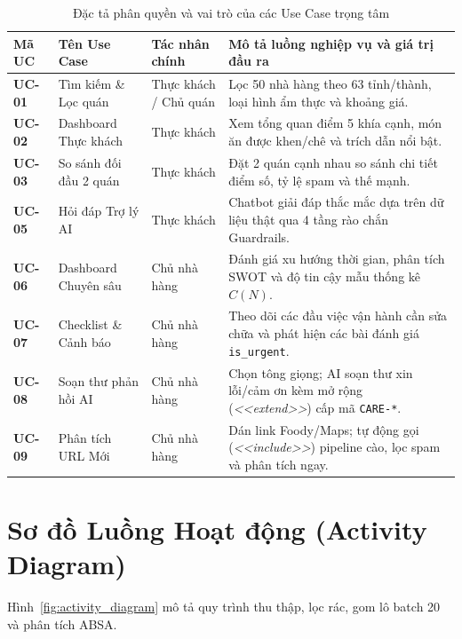 \documentclass[12pt, a4paper, oneside]{book}
\begin{document}
\begin{table}[H]
\centering
\caption{Đặc tả phân quyền và vai trò của các Use Case trọng tâm}
\label{tab:usecase_spec}
\vspace{0.15cm}
\footnotesize
\begin{tabularx}{\textwidth}{l l l X}
\toprule
\rowcolor{blue!8}
\textbf{Mã UC} & \textbf{Tên Use Case} & \textbf{Tác nhân chính} & \textbf{Mô tả luồng nghiệp vụ và giá trị đầu ra} \\
\midrule
\textbf{UC-01} & Tìm kiếm \& Lọc quán & Thực khách / Chủ quán & Lọc 50 nhà hàng theo 63 tỉnh/thành, loại hình ẩm thực và khoảng giá. \\
\textbf{UC-02} & Dashboard Thực khách & Thực khách & Xem tổng quan điểm 5 khía cạnh, món ăn được khen/chê và trích dẫn nổi bật. \\
\textbf{UC-03} & So sánh đối đầu 2 quán & Thực khách & Đặt 2 quán cạnh nhau so sánh chi tiết điểm số, tỷ lệ spam và thế mạnh. \\
\textbf{UC-05} & Hỏi đáp Trợ lý AI & Thực khách & Chatbot giải đáp thắc mắc dựa trên dữ liệu thật qua 4 tầng rào chắn Guardrails. \\
\textbf{UC-06} & Dashboard Chuyên sâu & Chủ nhà hàng & Đánh giá xu hướng thời gian, phân tích SWOT và độ tin cậy mẫu thống kê $C(N)$. \\
\textbf{UC-07} & Checklist \& Cảnh báo & Chủ nhà hàng & Theo dõi các đầu việc vận hành cần sửa chữa và phát hiện các bài đánh giá \texttt{is\_urgent}. \\
\textbf{UC-08} & Soạn thư phản hồi AI & Chủ nhà hàng & Chọn tông giọng; AI soạn thư xin lỗi/cảm ơn kèm mở rộng (\textit{<<extend>>}) cấp mã \texttt{CARE-*}. \\
\textbf{UC-09} & Phân tích URL Mới & Chủ nhà hàng & Dán link Foody/Maps; tự động gọi (\textit{<<include>>}) pipeline cào, lọc spam và phân tích ngay. \\
\bottomrule
\end{tabularx}
\end{table}

\section{Sơ đồ Luồng Hoạt động (Activity Diagram)}
Hình~\ref{fig:activity_diagram} mô tả quy trình thu thập, lọc rác, gom lô batch 20 và phân tích ABSA.
\end{document}
